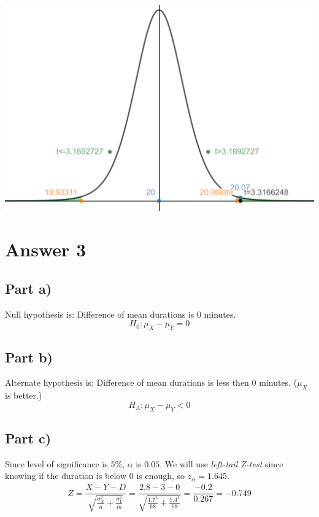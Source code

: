\documentclass[12pt]{article}
\begin{document}
\vspace{0.5cm}

\begin{center}
    \includegraphics[scale=0.35]{2c_new.png}
\end{center}

\newpage

\section*{Answer 3}

\subsection*{Part a)}
Null hypothesis is: Difference of mean durations is 0 minutes.
$$H_0 : \mu_X - \mu_Y = 0$$

\subsection*{Part b)}
Alternate hypothesis is: Difference of mean durations is less then 0 minutes. ($\mu_X$ is better.)
$$H_A : \mu_X - \mu_Y < 0$$

\subsection*{Part c)}
Since level of significance is 5\%, $\alpha$ is $0.05$. We will use \textit{left-tail Z-test} since knowing if the duration is below $0$ is enough, so $z_{\alpha} = 1.645$.
$$Z = \frac{\overline{X} - \overline{Y} - D}{\sqrt{\frac{\sigma_X^2}{n} + \frac{\sigma_Y^2}{m}}} = \frac{2.8 - 3 - 0}{\sqrt{\frac{1.7^2}{68} + \frac{1.4^2}{68}}} = \frac{-0.2}{0.267} = -0.749$$
\end{document}
